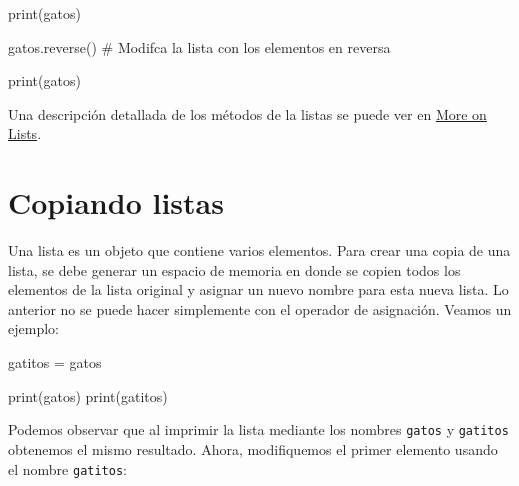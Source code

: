 \documentclass[
  letterpaper,
  DIV=11,
  numbers=noendperiod]{scrreprt}
\newenvironment{Shaded}{\begin{snugshade}}{\end{snugshade}}
\newcommand{\BuiltInTok}[1]{\textcolor[rgb]{0.00,0.23,0.31}{#1}}
\newcommand{\CommentTok}[1]{\textcolor[rgb]{0.37,0.37,0.37}{#1}}
\newcommand{\NormalTok}[1]{\textcolor[rgb]{0.00,0.23,0.31}{#1}}
\newcommand{\OperatorTok}[1]{\textcolor[rgb]{0.37,0.37,0.37}{#1}}
\begin{document}
\begin{Shaded}
\begin{Highlighting}[]
\BuiltInTok{print}\NormalTok{(gatos)}
\end{Highlighting}
\end{Shaded}

\begin{Shaded}
\begin{Highlighting}[]
\NormalTok{gatos.reverse() }\CommentTok{\# Modifca la lista con los elementos en reversa}
\end{Highlighting}
\end{Shaded}

\begin{Shaded}
\begin{Highlighting}[]
\BuiltInTok{print}\NormalTok{(gatos)}
\end{Highlighting}
\end{Shaded}

Una descripción detallada de los métodos de la listas se puede ver en
\href{https://docs.python.org/3/tutorial/datastructures.html\#more-on-lists}{More
on Lists}.

\section{Copiando listas}\label{copiando-listas}

Una lista es un objeto que contiene varios elementos. Para crear una
copia de una lista, se debe generar un espacio de memoria en donde se
copien todos los elementos de la lista original y asignar un nuevo
nombre para esta nueva lista. Lo anterior no se puede hacer simplemente
con el operador de asignación. Veamos un ejemplo:

\begin{Shaded}
\begin{Highlighting}[]
\NormalTok{gatitos }\OperatorTok{=}\NormalTok{ gatos}
\end{Highlighting}
\end{Shaded}

\begin{Shaded}
\begin{Highlighting}[]
\BuiltInTok{print}\NormalTok{(gatos)}
\BuiltInTok{print}\NormalTok{(gatitos)}
\end{Highlighting}
\end{Shaded}

Podemos observar que al imprimir la lista mediante los nombres
\texttt{gatos} y \texttt{gatitos} obtenemos el mismo resultado. Ahora,
modifiquemos el primer elemento usando el nombre \texttt{gatitos}:
\end{document}
